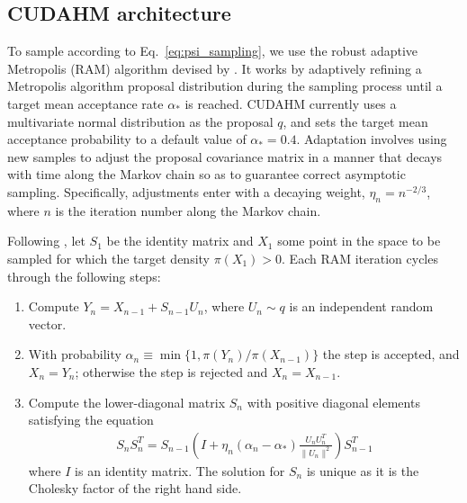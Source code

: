 \subsection{CUDAHM architecture}
\label{sec:arch}

To sample according to Eq.~\ref{eq:psi_sampling}, we use the robust adaptive Metropolis (RAM) algorithm devised by \cite{vihola2012robust}.
It works by adaptively refining a Metropolis algorithm proposal distribution during the sampling process until a target mean acceptance rate $\alpha_*$ is reached.
CUDAHM currently uses a multivariate normal distribution as the proposal $q$, and sets the target mean acceptance probability to a default value of $\alpha_{*}=0.4$.
Adaptation involves using new samples to adjust the proposal covariance matrix in a manner that decays with time along the Markov chain so as to guarantee correct asymptotic sampling.
Specifically, adjustments enter with a decaying weight, $\eta_{n}=n^{-2/3}$, where $n$ is the iteration number along the Markov chain.

Following \cite{vihola2012robust}, let $S_{1}$ be the identity matrix and $X_{1}$ some point in the space to be sampled for which the target density $\pi(X_{1})>0$.
Each RAM iteration cycles through the following steps: 
\begin{enumerate} \item Compute $Y_{n}=X_{n-1}+S_{n-1}U_{n}$, where $U_{n}\sim q$ is an independent random vector.
\item With probability $\alpha_{n} \equiv \min\{1,\pi(Y_{n})/\pi(X_{n-1})\}$ the step is accepted, and $X_{n}=Y_{n}$; otherwise the step is rejected and $X_{n}=X_{n-1}$.
\item Compute the lower-diagonal matrix $S_{n}$ with positive diagonal elements satisfying the equation
\begin{align}
S_{n}S_{n}^{T}=S_{n-1}\left(I+\eta_{n}(\alpha_{n}-\alpha_{*})\frac{U_{n}U_{n}^{T}}{\parallel U_{n}\parallel^{2}}\right)S_{n-1}^{T}
\end{align}
where $I$ is an identity matrix.
The solution for $S_{n}$ is unique as it is the Cholesky factor of the right hand side.
\end{enumerate}


